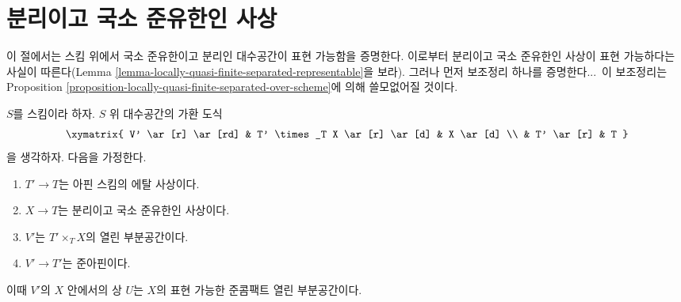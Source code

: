 \section{분리이고 국소 준유한인 사상}
\label{section-schemehood}

\noindent
이 절에서는 스킴 위에서 국소 준유한이고 분리인 대수공간이 표현
가능함을 증명한다. 이로부터 분리이고 국소 준유한인 사상이 표현
가능하다는 사실이 따른다(Lemma
\ref{lemma-locally-quasi-finite-separated-representable}을 보라). 그러나
먼저 보조정리 하나를 증명한다...\ 이 보조정리는 Proposition
\ref{proposition-locally-quasi-finite-separated-over-scheme}에 의해
쓸모없어질 것이다.

\begin{lemma}
\label{lemma-neighbourhood-scheme}
$S$를 스킴이라 하자. $S$ 위 대수공간의 가환 도식
$$
\xymatrix{
V' \ar[r] \ar[rd] & T' \times_T X \ar[r] \ar[d] & X \ar[d] \\
& T' \ar[r] & T
}
$$
을 생각하자. 다음을 가정한다.
\begin{enumerate}
\item $T' \to T$는 아핀 스킴의 에탈 사상이다.
\item $X \to T$는 분리이고 국소 준유한인 사상이다.
\item $V'$는 $T' \times_T X$의 열린 부분공간이다.
\item $V' \to T'$는 준아핀이다.
\end{enumerate}
이때 $V'$의 $X$ 안에서의 상 $U$는 $X$의 표현 가능한 준콤팩트 열린
부분공간이다.
\end{lemma}

